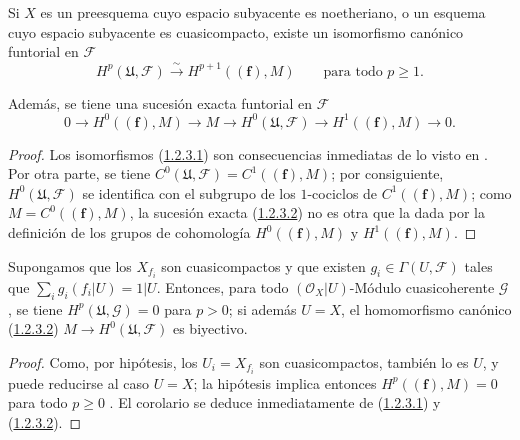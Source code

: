 \begin{proposition}[1.2.3]
\label{III.1.2.3}
\label{III.1.2.3-fr}
Si $X$ es un preesquema cuyo espacio subyacente es noetheriano, o un esquema cuyo espacio subyacente es cuasicompacto, existe un isomorfismo canónico funtorial en $\mathcal F$
\begin{equation}
\label{III.1.2.3.1-fr}
\tag{1.2.3.1}
H^p(\mathfrak U,\mathcal F)\xrightarrow{\sim}H^{p+1}((\mathbf f),M)
\qquad\text{para todo }p\geq1.
\end{equation}

Además, se tiene una sucesión exacta funtorial en $\mathcal F$
\begin{equation}
\label{III.1.2.3.2-fr}
\tag{1.2.3.2}
0\longrightarrow H^0((\mathbf f),M)\longrightarrow M
\longrightarrow H^0(\mathfrak U,\mathcal F)
\longrightarrow H^1((\mathbf f),M)\longrightarrow0.
\end{equation}
\end{proposition}

\begin{proof}
Los isomorfismos (\hyperref[III.1.2.3.1]{1.2.3.1}) son consecuencias inmediatas de lo visto en .
Por otra parte, se tiene $C^0(\mathfrak U,\mathcal F)=C^1((\mathbf f),M)$; por consiguiente, $H^0(\mathfrak U,\mathcal F)$ se identifica con el subgrupo de los $1$-cociclos de $C^1((\mathbf f),M)$; como $M=C^0((\mathbf f),M)$, la sucesión exacta (\hyperref[III.1.2.3.2]{1.2.3.2}) no es otra que la dada por la definición de los grupos de cohomología $H^0((\mathbf f),M)$ y $H^1((\mathbf f),M)$.
\end{proof}

\begin{corollary}[1.2.4]
\label{III.1.2.4}
\label{III.1.2.4-fr}
Supongamos que los $X_{f_i}$ son cuasicompactos y que existen $g_i\in\Gamma(U,\mathcal F)$ tales que
$\sum_i g_i(f_i\vert U)=1\vert U$. Entonces, para todo
$(\mathcal O_X\vert U)$-Módulo cuasicoherente $\mathcal G$, se tiene $H^p(\mathfrak U,\mathcal G)=0$ para $p>0$; si además $U=X$, el homomorfismo canónico \textup{(\hyperref[III.1.2.3.2]{1.2.3.2})} $M\to H^0(\mathfrak U,\mathcal F)$ es biyectivo.
\end{corollary}

\begin{proof}
Como, por hipótesis, los $U_i=X_{f_i}$ son cuasicompactos, también lo es $U$, y puede reducirse al caso $U=X$; la hipótesis implica entonces
$H^p((\mathbf f),M)=0$ para todo $p\geq0$ .
El corolario se deduce inmediatamente de (\hyperref[III.1.2.3.1]{1.2.3.1}) y (\hyperref[III.1.2.3.2]{1.2.3.2}).
\end{proof}

